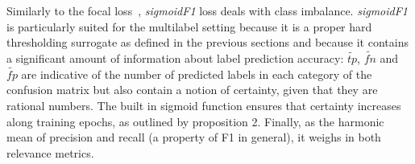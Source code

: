 Similarly to the focal loss~\cite{focalLoss}, \emph{sigmoidF1} loss deals with class imbalance. \emph{sigmoidF1} is particularly suited for the multilabel setting because it is a proper hard thresholding surrogate as defined in the previous sections and because it contains a significant amount of information about label prediction accuracy: $\widetilde{\mathit{tp}}$, $\widetilde{\mathit{fn}}$ and $\widetilde{\mathit{fp}}$ are indicative of the number of predicted labels in each category of the confusion matrix but also contain a notion of certainty, given that they are rational numbers. The built in sigmoid function ensures that certainty increases along training epochs, as outlined by proposition 2. Finally, as the harmonic mean of precision and recall (a property of F1 in general), it weighs in both relevance metrics.













